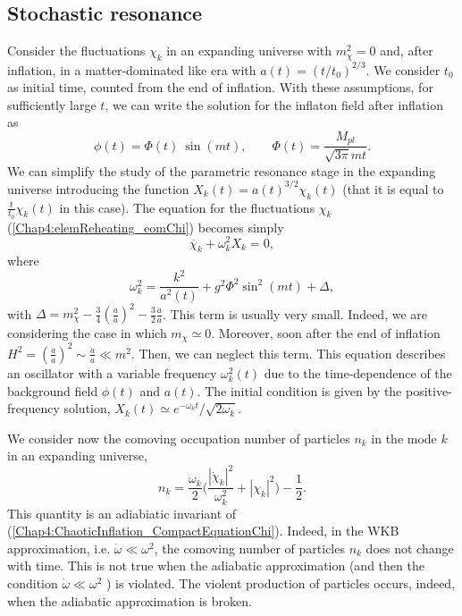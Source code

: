 \documentclass[11pt,a4paper,twoside]{book}
\begin{document}
\subsection{Stochastic resonance}
Consider the fluctuations $\chi_{k}$ in an expanding universe with $ m^{2}_{\chi}=0 $ and, after inflation, in a matter-dominated like era with $ a(t)=(t/t_{0})^{2/3} $. We consider $ t_{0} $ as initial time, counted from the end of inflation. 
With these assumptions, for sufficiently large $ t $, we can write the solution for the inflaton field after inflation as 
\begin{equation}
\label{Chap4:solutionInflaton}
\phi(t)=\Phi(t)\ \sin(mt),
\qquad
\Phi(t) = \frac{M_{pl}}{\sqrt{3\pi}mt}.
\end{equation}
We can simplify the study of the parametric resonance stage in the expanding universe introducing the function $ X_{k}(t)=a(t)^{3/2}\chi_{k}(t) $ (that it is equal to $ \frac{t}{t_{0}}\chi_{k}(t) $ in this case). The equation for the fluctuations $ \chi_{k} $ (\ref{Chap4:elemReheating_eomChi}) becomes simply
\begin{equation}
	\label{Chap4:ChaoticInflation_CompactEquationChi}
	\ddot{\chi_{k}} + \omega_{k}^{2}X_{k} = 0,
\end{equation}
where 
\begin{equation}
	\label{Chap4:ChaoticInflation_Omega_k}
	\omega_{k}^{2}=\frac{k^{2}}{a^{2}(t)} + g^{2}\Phi^{2}\sin^{2}(mt) + \Delta,
\end{equation}
with $ \Delta=m_{\chi}^{2}-\frac{3}{4}(\frac{\dot{a}}{a})^{2}-\frac{3}{2}\frac{\ddot{a}}{a} $. This term is usually very small. Indeed, we are considering the case in which $ m_{\chi}\simeq 0 $. Moreover,  soon after the end of inflation $ H^{2}=(\frac{\dot{a}}{a})^{2}\sim \frac{\ddot{a}}{a} \ll m^{2} $. Then, we can neglect this term. This equation describes an oscillator with a variable frequency $ \omega_{k}^{2}(t) $ due to the time-dependence of the background field $\phi(t)$ and $ a(t) $. The initial condition is given by the positive-frequency solution, $ X_{k}(t) \simeq e^{-\omega_{k}t}/\sqrt{2\omega_{k}} $.

We consider now the comoving occupation number of particles $ n_{k} $ in the mode $ k $ in an expanding universe,
\begin{equation}
	\label{Chap4:comovNumberParticles}
	n_{k}=\frac{\omega_{k}}{2}\Bigg(\frac{|\dot{\chi}_{k}|^{2}}{\omega^{2}_{k}} + |\chi_{k}|^{2}\Bigg) - \frac{1}{2}.
\end{equation}
This quantity is an adiabiatic invariant of (\ref{Chap4:ChaoticInflation_CompactEquationChi}). Indeed, in the WKB approximation, i.e. $\dot{\omega} \ll \omega^{2}$, the comoving number of particles $ n_{k} $ does not change with time. This is not true when the adiabatic approximation (and then the condition $\dot{\omega} \ll \omega^{2}$ ) is violated. The violent production of particles occurs, indeed, when the adiabatic approximation is broken.
\end{document}
